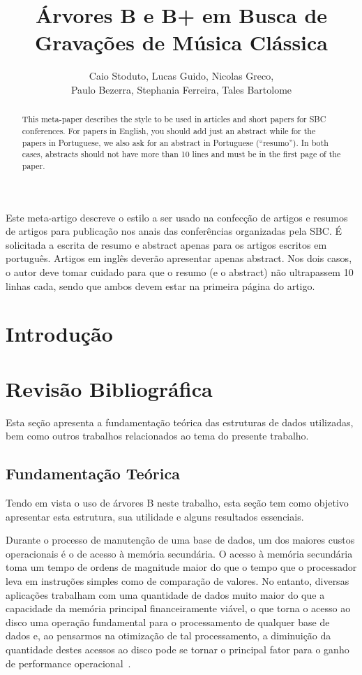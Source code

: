 \documentclass[12pt]{article}
\title{Árvores B e B\nolinebreak+ em Busca de Gravações de Música Clássica\\}
\author{Caio Stoduto\inst{1}, Lucas Guido\inst{1}, Nicolas Greco\inst{1},\\
Paulo Bezerra\inst{1}, Stephania Ferreira\inst{1}, Tales Bartolome\inst{1}}
\begin{document}
 

\maketitle

\begin{abstract}
  This meta-paper describes the style to be used in articles and short papers
  for SBC conferences. For papers in English, you should add just an abstract
  while for the papers in Portuguese, we also ask for an abstract in Portuguese
  (``resumo''). In both cases, abstracts should not have more than 10 lines and
  must be in the first page of the paper.
\end{abstract}
     
\begin{resumo} 
  Este meta-artigo descreve o estilo a ser usado na confecção de artigos e
  resumos de artigos para publicação nos anais das conferências organizadas pela
  SBC. É solicitada a escrita de resumo e abstract apenas para os artigos
  escritos em português. Artigos em inglês deverão apresentar apenas abstract.
  Nos dois casos, o autor deve tomar cuidado para que o resumo (e o abstract)
  não ultrapassem 10 linhas cada, sendo que ambos devem estar na primeira página
  do artigo.
\end{resumo}


\section{Introdução} 



\section{Revisão Bibliográfica} \label{sec:revisao}
Esta seção apresenta a fundamentação teórica das estruturas de dados utilizadas,
bem como outros trabalhos relacionados ao tema do presente trabalho.

\subsection{Fundamentação Teórica}
Tendo em vista o uso de árvores B neste trabalho, esta seção tem como objetivo 
apresentar esta estrutura, sua utilidade e alguns resultados essenciais.

Durante o processo de manutenção de uma base de dados, um dos maiores custos
operacionais é o de acesso à memória secundária.
O acesso à memória secundária toma um tempo de ordens de magnitude maior do que
o tempo que o processador leva em instruções simples como de comparação de valores.
No entanto, diversas aplicações trabalham com uma quantidade de dados muito maior
do que a capacidade da memória principal financeiramente viável, o que torna o
acesso ao disco uma operação fundamental para o processamento de qualquer base
de dados e, ao pensarmos na otimização de tal processamento, a diminuição da
quantidade destes acessos ao disco pode se tornar o principal fator para o ganho
de performance operacional~\cite{clrs:22}.
\end{document}
